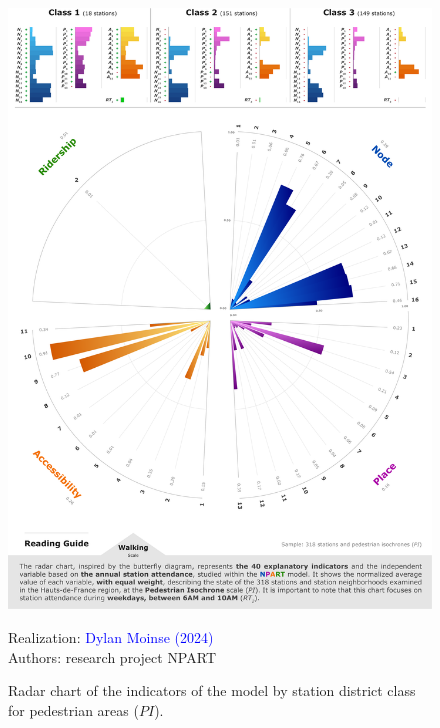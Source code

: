 \begin{refsegment}
    \begin{figure}[h!]\vspace*{4pt}
        \caption{Radar chart of the indicators of the model by station district class for pedestrian areas (\(PI\)).}
        \label{fig-chap6:radar-pi}
        \centerline{\includegraphics[width=1\columnwidth]{src/Figures/Chap-6/EN_NPART_Radar_PI.pdf}}
        \vspace{5pt}
        \begin{flushright}\scriptsize{
        Realization: \textcolor{blue}{Dylan Moinse (2024)}
        \\
        Authors: research project \acrshort{NPART}
        }\end{flushright}
    \end{figure}


\end{refsegment}

